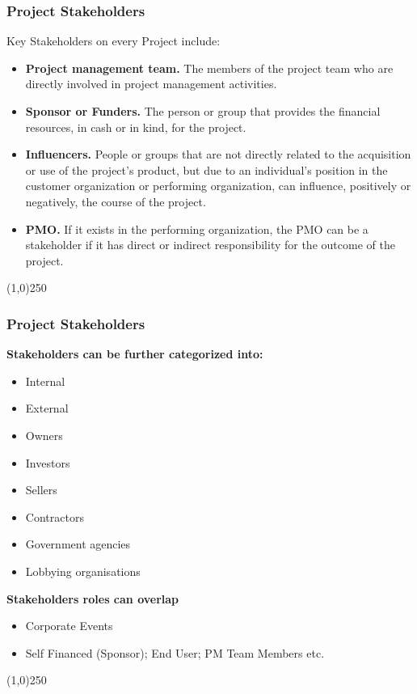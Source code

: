 \begin{frame}
\frametitle{Project Stakeholders}
Key Stakeholders on every Project include:\\
\begin{itemize}
	\item \textbf{Project management team.} The members of the project team who are directly involved in project management activities. 
	\item \textbf{Sponsor or Funders.} The person or group that provides the financial resources, in cash or in kind, for the project. 
	\item \textbf{Influencers.} People or groups that are not directly related to the acquisition or use of the project's product, but due to an individual's position in the customer organization or performing organization, can influence, positively or negatively, the course of the project. 
	\item \textbf{PMO.} If it exists in the performing organization, the PMO can be a stakeholder if it has direct or indirect responsibility for the outcome of the project. 
\end{itemize}
\end{frame}
\begin{center}\line(1,0){250}\end{center}





\begin{frame}
\frametitle{Project Stakeholders}
\textbf{Stakeholders can be further categorized into:}\\
	\begin{itemize}
	\item Internal
	\item External
	\item Owners
	\item Investors
	\item Sellers
	\item Contractors
	\item Government agencies
	\item Lobbying organisations
	\end{itemize}
\textbf{Stakeholders roles can overlap}\\
	\begin{itemize}
	\item Corporate Events
	\item Self Financed (Sponsor); End User; PM Team Members etc.
	\end{itemize}
\end{frame}
\begin{center}\line(1,0){250}\end{center}



